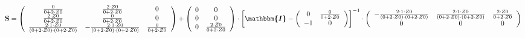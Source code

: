 \begin{equation} \mathbf{S} = \left(\begin{array}{ccc}
\frac{0}{0+2\cdot Z0} & \frac{2\cdot Z0}{0+2\cdot Z0} & 0 \\
\frac{2\cdot Z0}{0+2\cdot Z0} & \frac{0}{0+2\cdot Z0} & 0 \\
\frac{2\cdot 1\cdot Z0}{ (0+2\cdot Z0 )\cdot (0+2\cdot Z0 )} &
-\frac{2\cdot 1\cdot Z0}{ (0+2\cdot Z0 )\cdot (0+2\cdot Z0 )} &
\frac{0}{0+2\cdot Z0} \end{array}\right) + \left(\begin{array}{cc} 0 &
0 \\ 0 & 0 \\ 0 & \frac{2\cdot Z0}{0+2\cdot Z0} \end{array}\right)
\cdot \left[ \boldsymbol{\mathbbm{I}}  - \left(\begin{array}{cc} 0 &
\frac{0}{0+2\cdot Z0} \\ -1 & 0 \end{array}\right) \right]^{-1}
\cdot\left(\begin{array}{ccc} -\frac{2\cdot 1\cdot Z0}{ (0+2\cdot Z0
)\cdot (0+2\cdot Z0 )} & \frac{2\cdot 1\cdot Z0}{ (0+2\cdot Z0 )\cdot
(0+2\cdot Z0 )} & \frac{2\cdot Z0}{0+2\cdot Z0} \\ 0 & 0 & 0
\end{array}\right) \end{equation}
